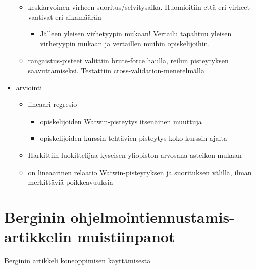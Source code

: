 \documentclass[finnish,twoside,openright]{HYgraduMLDS}
\begin{document}
\begin{itemize}
\begin{itemize}
\begin{itemize}
        \end{itemize}
        \item keskiarvoinen virheen suoritus/selvitysaika. Huomioitiin että eri virheet vaativat eri aikamäärän
        \begin{itemize}
            \item Jälleen yleisen virhetyypin mukaan! Vertailu tapahtuu yleisen virhetyypin mukaan ja vertaillen muihin opiskelijoihin.
        \end{itemize}
        \item rangaistus-pisteet valittiin brute-force haulla, reilun pisteytyksen saavuttamiseksi. Testattiin cross-validation-menetelmällä
    \end{itemize}
    \item arviointi
    \begin{itemize}
        \item lineaari-regresio
        \begin{itemize}
            \item opiskelijoiden Watwin-pisteytys itsenäinen muuttuja
            \item opiskelijoiden kurssin tehtävien pisteytys koko kurssin ajalta
        \end{itemize} 
        \item Harkittiin luokittelijaa kyseisen yliopiston arvosana-asteikon mukaan
        \item on lineaarinen relaatio Watwin-pisteytyksen ja suorituksen välillä, ilman merkittäviä poikkeavuuksia
    \end{itemize}
\end{itemize}

\chapter{Berginin ohjelmointiennustamis-artikkelin muistiinpanot}

Berginin artikkeli koneoppimisen käyttämisestä\cite{bergin2015using}
\end{document}
